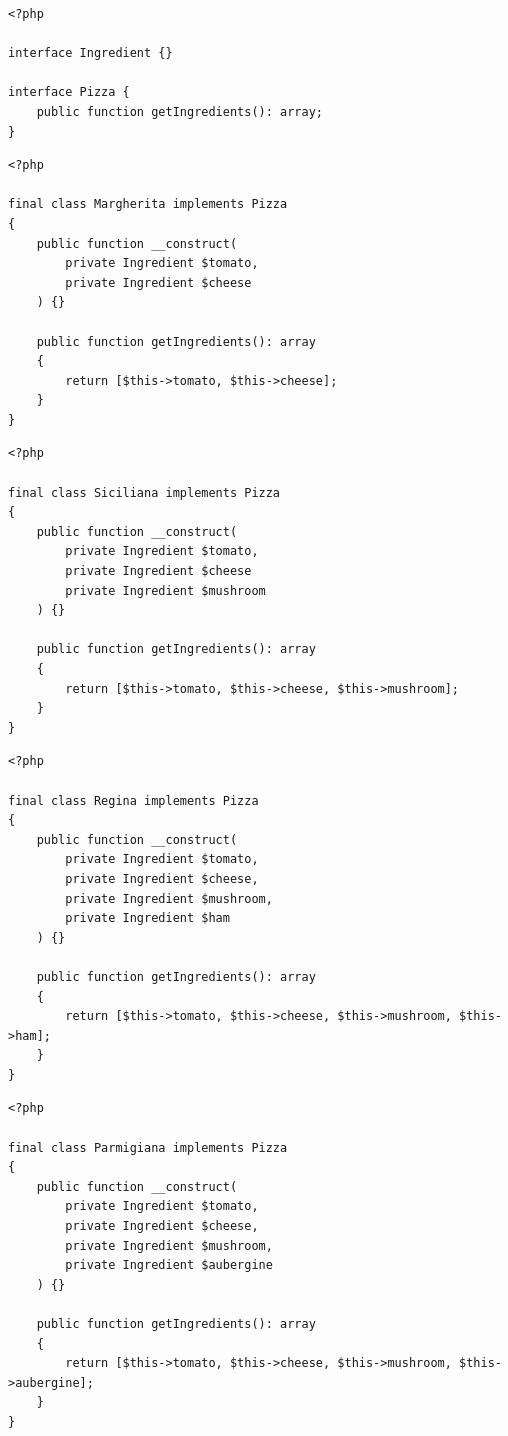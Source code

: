 \begin{frame}[fragile,c]
    \begin{lstlisting}
<?php

interface Ingredient {}

interface Pizza {
    public function getIngredients(): array;
}
    \end{lstlisting}
\end{frame}

\begin{frame}[fragile,c]
    \begin{lstlisting}
<?php

final class Margherita implements Pizza
{
    public function __construct(
        private Ingredient $tomato,
        private Ingredient $cheese
    ) {}

    public function getIngredients(): array
    {
        return [$this->tomato, $this->cheese];
    }
}
    \end{lstlisting}
\end{frame}

\begin{frame}[fragile,c]
    \begin{lstlisting}
<?php

final class Siciliana implements Pizza
{
    public function __construct(
        private Ingredient $tomato,
        private Ingredient $cheese
        private Ingredient $mushroom
    ) {}

    public function getIngredients(): array
    {
        return [$this->tomato, $this->cheese, $this->mushroom];
    }
}
    \end{lstlisting}
\end{frame}

\begin{frame}[fragile,c]
    \begin{lstlisting}
<?php

final class Regina implements Pizza
{
    public function __construct(
        private Ingredient $tomato,
        private Ingredient $cheese,
        private Ingredient $mushroom,
        private Ingredient $ham
    ) {}

    public function getIngredients(): array
    {
        return [$this->tomato, $this->cheese, $this->mushroom, $this->ham];
    }
}
    \end{lstlisting}
\end{frame}

\begin{frame}[fragile,c]
    \begin{lstlisting}
<?php

final class Parmigiana implements Pizza
{
    public function __construct(
        private Ingredient $tomato,
        private Ingredient $cheese,
        private Ingredient $mushroom,
        private Ingredient $aubergine
    ) {}

    public function getIngredients(): array
    {
        return [$this->tomato, $this->cheese, $this->mushroom, $this->aubergine];
    }
}
    \end{lstlisting}
\end{frame}


